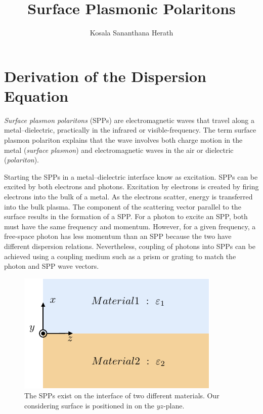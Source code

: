 \documentclass[a4paper]{article}
\title{Surface Plasmonic Polaritons}
\author{Kosala Sananthana Herath}
\numberwithin{equation}{subsection}
\numberwithin{equation}{section}
\begin{document}
\maketitle

\section{Derivation of the Dispersion Equation}
\textit{Surface plasmon polaritons} (SPPs) are electromagnetic waves that travel along a metal–dielectric, practically in the infrared or visible-frequency. The term surface plasmon polariton explains that the wave involves both charge motion in the metal (\textit{surface plasmon}) and electromagnetic waves in the air or dielectric (\textit{polariton}).

Starting the SPPs in a metal–dielectric interface know as excitation. SPPs can be excited by both electrons and photons. Excitation by electrons is created by firing electrons into the bulk of a metal. As the electrons scatter, energy is transferred into the bulk plasma. The component of the scattering vector parallel to the surface results in the formation of a SPP. For a photon to excite an SPP, both must have the same frequency and momentum. However, for a given frequency, a free-space photon has less momentum than an SPP because the two have different dispersion relations. Nevertheless, coupling of photons into SPPs can be achieved using a coupling medium such as a prism or grating to match the photon and SPP wave vectors.
\begin{figure}[ht!]
  \centering
  \includegraphics{figures/fig1}
  \caption{The SPPs exist on the interface of two different materials. Our considering surface is positioned in on the $yz$-plane.}
  \label{fig1}
\end{figure}
\end{document}
